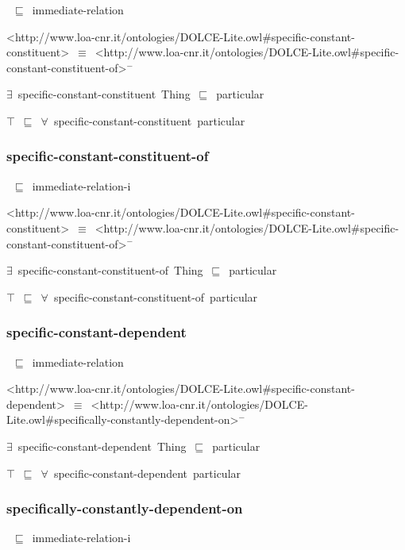 \documentclass{article}
\begin{document}
~\ensuremath{\sqsubseteq}~immediate-relation

<http://www.loa-cnr.it/ontologies/DOLCE-Lite.owl#specific-constant-constituent>~\ensuremath{\equiv}~<http://www.loa-cnr.it/ontologies/DOLCE-Lite.owl#specific-constant-constituent-of>\ensuremath{^-}

\ensuremath{\exists}~specific-constant-constituent~Thing~\ensuremath{\sqsubseteq}~particular

\ensuremath{\top}~\ensuremath{\sqsubseteq}~\ensuremath{\forall}~specific-constant-constituent~particular

\subsubsection*{specific-constant-constituent-of}

~\ensuremath{\sqsubseteq}~immediate-relation-i

<http://www.loa-cnr.it/ontologies/DOLCE-Lite.owl#specific-constant-constituent>~\ensuremath{\equiv}~<http://www.loa-cnr.it/ontologies/DOLCE-Lite.owl#specific-constant-constituent-of>\ensuremath{^-}

\ensuremath{\exists}~specific-constant-constituent-of~Thing~\ensuremath{\sqsubseteq}~particular

\ensuremath{\top}~\ensuremath{\sqsubseteq}~\ensuremath{\forall}~specific-constant-constituent-of~particular

\subsubsection*{specific-constant-dependent}

~\ensuremath{\sqsubseteq}~immediate-relation

<http://www.loa-cnr.it/ontologies/DOLCE-Lite.owl#specific-constant-dependent>~\ensuremath{\equiv}~<http://www.loa-cnr.it/ontologies/DOLCE-Lite.owl#specifically-constantly-dependent-on>\ensuremath{^-}

\ensuremath{\exists}~specific-constant-dependent~Thing~\ensuremath{\sqsubseteq}~particular

\ensuremath{\top}~\ensuremath{\sqsubseteq}~\ensuremath{\forall}~specific-constant-dependent~particular

\subsubsection*{specifically-constantly-dependent-on}

~\ensuremath{\sqsubseteq}~immediate-relation-i
\end{document}
